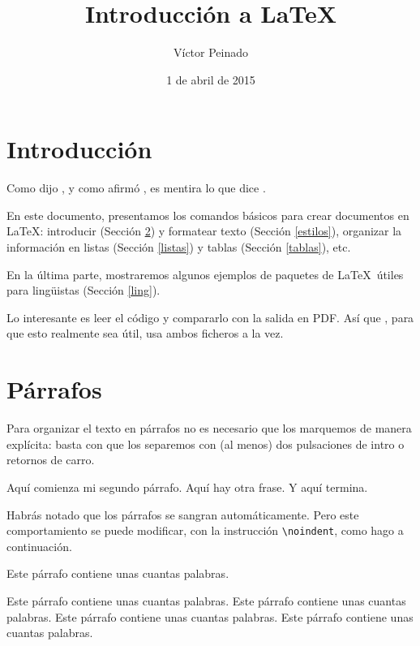 \documentclass[a4paper]{article}
\title{Introducción a \LaTeX}
\author{Víctor Peinado}
\date{1 de abril de 2015}
\begin{document}
\maketitle

\section{Introducción}
\label{sec:intro}

Como dijo \cite{einstein}, y como afirmó \cite{latexcompanion}, es mentira lo que dice \cite{knuthwebsite}.

En este documento, presentamos los comandos básicos para crear documentos en \LaTeX: introducir (Sección \ref{parrafos})  y formatear texto (Sección \ref{estilos}), organizar la información en listas (Sección \ref{listas}) y tablas (Sección \ref{tablas}), etc. 

En la última parte, mostraremos algunos ejemplos de paquetes de \LaTeX\ útiles para lingüistas (Sección \ref{ling}).

Lo interesante es leer el código y compararlo con la salida en PDF. Así que , para que esto realmente sea útil, usa ambos ficheros a la vez.


\section{Párrafos}
\label{parrafos}

Para organizar el texto en párrafos no es necesario que los marquemos de manera explícita: basta con que los separemos con (al menos) dos pulsaciones de intro o retornos de carro.

Aquí comienza mi segundo párrafo.                           
Aquí hay otra frase.                      Y aquí termina.




Habrás notado que los párrafos se sangran automáticamente. Pero este comportamiento se puede modificar, con la instrucción \texttt{\textbackslash noindent}, como hago a continuación.

\noindent Este párrafo contiene unas cuantas palabras.


\noindent Este párrafo contiene unas cuantas palabras. Este párrafo contiene unas cuantas palabras. Este párrafo contiene unas cuantas palabras. Este párrafo contiene unas cuantas palabras.
\end{document}
